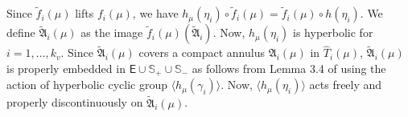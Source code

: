 \documentclass{amsart}
\numberwithin{equation}{section}
\newcommand\bR{{\mathbb{R}}}
\newcommand\ra{\rightarrow}
\newcommand\Ss{{\mathbb{S}}}
\newcommand\Lspace{\mathsf E}
\theoremstyle{definition}
\theoremstyle{remark}
\begin{document}




Since $\tilde f_i(\mu)$ lifts $f_i(\mu)$, we have 
$h_\mu(\eta_i) \circ \tilde f_i(\mu) = \tilde f_i(\mu) \circ h(\eta_i)$. 
We define $\tilde {\mathfrak{A}}_i(\mu)$ as the image $\tilde f_i(\mu)(\tilde {\mathfrak{A}}_i)$. 
Now, $h_\mu(\eta_i)$ is hyperbolic for $i=1, \dots, k_v$. 
Since $\tilde {\mathfrak{A}}_i(\mu)$ covers a compact annulus ${\mathfrak{A}}_i(\mu)$ in $\hat T_i(\mu)$, 
$\tilde {\mathfrak{A}}_i(\mu)$ is properly embedded in $\Lspace \cup \Ss_+ \cup \Ss_-$
as follows from Lemma 3.4 of \cite{CG17}
using the action of hyperbolic cyclic group $\langle h_\mu(\gamma_i)\rangle$.
Now, $\langle h_\mu(\eta_i) \rangle$ acts freely and properly discontinuously 
on $\tilde {\mathfrak{A}}_i(\mu)$. 
\end{document}
